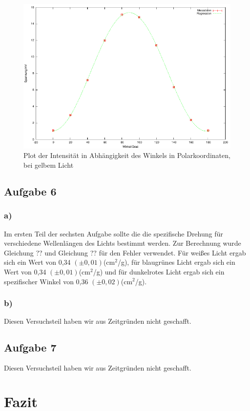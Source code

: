 \documentclass[12pt]{scrartcl}
\begin{document}
\begin{figure}[H]
\centering
    \includegraphics[scale = 1]{a_5_d.pdf}
  	\caption[Plot der Intensität in Abhängigkeit des Winkels in Polarkoordinaten, bei gelbem Licht]{Plot der Intensität in Abhängigkeit des Winkels in Polarkoordinaten, bei gelbem Licht}
  \label{fig:a_5_d}
\end{figure}


\subsection{Aufgabe 6}

\subsubsection{a)}
Im ersten Teil der sechsten Aufgabe sollte die die spezifische Drehung für verschiedene Wellenlängen des Lichts bestimmt werden. Zur Berechnung wurde Gleichung ?? und Gleichung ?? für den Fehler verwendet. Für weißes Licht ergab sich ein Wert von 0,34 $(\pm 0,01)$(cm$^2$/g), für blaugrünes Licht ergab sich ein Wert von 0,34 $(\pm 0,01)$(cm$^2$/g) und für dunkelrotes Licht ergab sich ein spezifischer Winkel von 0,36 $(\pm 0,02)$(cm$^2$/g).

\subsubsection{b)}
Diesen Versuchsteil haben wir aus Zeitgründen nicht geschafft.

\subsection{Aufgabe 7}
Diesen Versuchsteil haben wir aus Zeitgründen nicht geschafft.



\section{Fazit}


\end{document}
